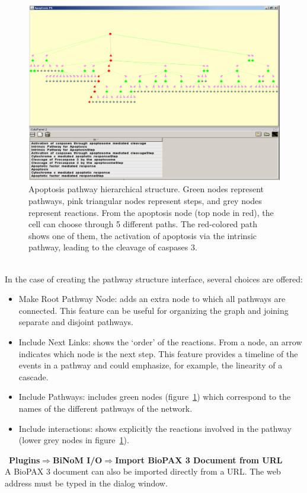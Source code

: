 \begin{figure}
\centering
\includegraphics[width=18 cm]{graphics/Apoptosis_pathway_hierarchical_structure}
\caption{Apoptosis pathway hierarchical structure. Green nodes represent pathways, pink triangular nodes represent steps, and grey nodes represent reactions. From the apoptosis node (top node in red), the cell can choose through 5 different paths. The red-colored path shows one of them, the activation of apoptosis via the intrinsic pathway, leading to the cleavage of caspases 3.}
\label{Apoptosis_pathway_hierarchical_structure}
\end{figure}
\\In the case of creating the pathway structure interface, several choices are offered:
\begin{itemize}
\item Make Root Pathway Node: adds an extra node to which all pathways are connected. This feature can be useful for organizing the graph and joining separate and disjoint pathways.
\item Include Next Links: shows the ‘order’ of the reactions. From a node, an arrow indicates which node is the next step. This feature provides a timeline of the events in a pathway and could emphasize, for example, the linearity of a cascade.
\item Include Pathways: includes green nodes (figure~\ref{Apoptosis_pathway_hierarchical_structure}) which correspond to the names of the different pathways of the network.
\item Include interactions: shows explicitly the reactions involved in the pathway (lower grey nodes in figure~\ref{Apoptosis_pathway_hierarchical_structure}).
\end{itemize}\
\textbf{Plugins$\Rightarrow$BiNoM I/O$\Rightarrow$Import BioPAX 3 Document from URL}\\
A BioPAX 3 document can also be imported directly from a URL. The web address must be typed in the dialog window.


